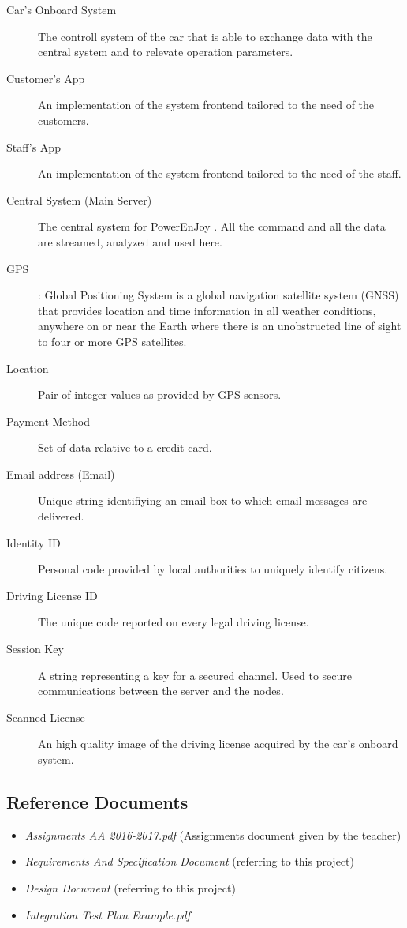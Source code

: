 \documentclass[11pt]{article} %
\newcommand{\pe}{PowerEnJoy }
\begin{document}
\begin{description}
	\item[Car's Onboard System] The controll system of the car that is able to exchange data with the central system and to relevate operation parameters.
	\item[Customer's App] An implementation of the system frontend tailored to the need of the customers.
	\item[Staff's App] An implementation of the system frontend tailored to the need of the staff.
	\item[Central System (Main Server)] The central system for \pe. All the command and all the data are streamed, analyzed and used here.
	\item[GPS]: Global Positioning System is a global navigation satellite system (GNSS) that provides location and time information in all weather conditions, anywhere on or near the Earth where there is an unobstructed line of sight to four or more GPS satellites.
	\item[Location] Pair of integer values as provided by GPS sensors.
	\item[Payment Method] Set of data relative to a credit card.
	\item[Email address (Email)] Unique string identifiying an email box to which email messages are delivered.
	\item[Identity ID] Personal code provided by local authorities to uniquely identify citizens.
	\item[Driving License ID] The unique code reported on every legal driving license.
	\item[Session Key]  A string representing a key for a secured channel. Used to secure communications between the server and the nodes.
	\item[Scanned License] An high quality image of the driving license acquired by the car's onboard system.
  \end{description}

\subsection{Reference Documents}
\begin{itemize}
	\item \textit{Assignments AA 2016-2017.pdf} (Assignments document given by the teacher)
	\item \textit{Requirements And Specification Document} (referring to this project)
	\item \textit{Design Document} (referring to this project)
	\item \textit{Integration Test Plan Example.pdf}
  \end{itemize}
\end{document}
